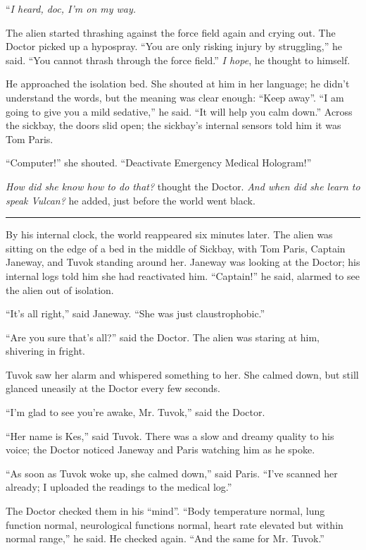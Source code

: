 \documentclass[twoside,letterpaper,12pt]{memoir}
\begin{document}
``\textit{I heard, doc, I'm on my way.} 

The alien started thrashing against the force field again and crying out. The Doctor picked up a hypospray. ``You are only risking injury by struggling,'' he said. ``You cannot thrash through the force field.'' \textit{I hope}, he thought to himself. 

He approached the isolation bed. She shouted at him in her language; he didn't understand the words, but the meaning was clear enough: ``Keep away''. ``I am going to give you a mild sedative,'' he said. ``It will help you calm down.'' Across the sickbay, the doors slid open; the sickbay's internal sensors told him it was Tom Paris. 

``Computer!'' she shouted. ``Deactivate Emergency Medical Hologram!'' 

\textit{How did she know how to do that?} thought the Doctor. \textit{And when did she learn to speak Vulcan?} he added, just before the world went black. 

\fancybreak{\rule{3cm}{0.4 pt}} 

By his internal clock, the world reappeared six minutes later. The alien was sitting on the edge of a bed in the middle of Sickbay, with Tom Paris, Captain Janeway, and Tuvok standing around her. Janeway was looking at the Doctor; his internal logs told him she had reactivated him. ``Captain!'' he said, alarmed to see the alien out of isolation. 

``It's all right,'' said Janeway. ``She was just claustrophobic.'' 

``Are you sure that's all?'' said the Doctor. The alien was staring at him, shivering in fright. 

Tuvok saw her alarm and whispered something to her. She calmed down, but still glanced uneasily at the Doctor every few seconds. 

``I'm glad to see you're awake, Mr. Tuvok,'' said the Doctor. 

``Her name is Kes,'' said Tuvok. There was a slow and dreamy quality to his voice; the Doctor noticed Janeway and Paris watching him as he spoke. 

``As soon as Tuvok woke up, she calmed down,'' said Paris. ``I've scanned her already; I uploaded the readings to the medical log.'' 

The Doctor checked them in his ``mind''. ``Body temperature normal, lung function normal, neurological functions normal, heart rate elevated but within normal range,'' he said. He checked again. ``And the same for Mr. Tuvok.'' 
\end{document}
